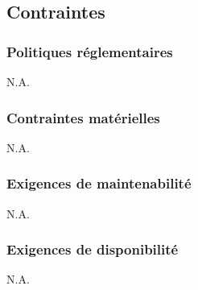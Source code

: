 \newpage
\subsection{Contraintes}

\subsubsection{Politiques réglementaires}
N.A.
\subsubsection{Contraintes matérielles}
N.A.
\subsubsection{Exigences de maintenabilité}
N.A.
\subsubsection{Exigences de disponibilité}
N.A.